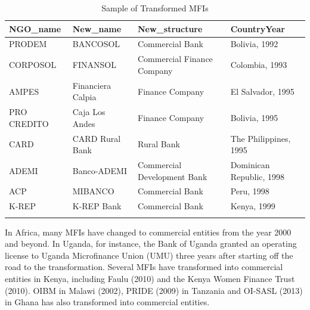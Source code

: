 \documentclass[a4paper, nobind]{templates/ociamthesis}
\begin{document}
\begin{table}

\caption{\label{tab:unnamed-chunk-3}Sample of Transformed MFIs}
\centering
\fontsize{9}{11}\selectfont
\begin{tabu} to 
\toprule
NGO\_name & New\_name & New\_structure & CountryYear\\
\midrule
PRODEM & BANCOSOL & Commercial Bank & Bolivia, 1992\\
CORPOSOL & FINANSOL & Commercial Finance Company & Colombia, 1993\\
AMPES & Financiera Calpia & Finance Company & El Salvador, 1995\\
PRO CREDITO & Caja Los Andes & Finance Company & Bolivia, 1995\\
CARD & CARD Rural Bank & Rural Bank & The Philippines, 1995\\
\addlinespace
ADEMI & Banco-ADEMI & Commercial Development Bank & Dominican Republic, 1998\\
ACP & MIBANCO & Commercial Bank & Peru, 1998\\
K-REP & K-REP Bank & Commercial Bank & Kenya, 1999\\
\bottomrule
{}\\
\end{tabu}
\end{table}

In Africa, many MFIs have changed to commercial entities from the year 2000 and beyond. In Uganda, for instance, the Bank of Uganda granted an operating license to Uganda Microfinance Union (UMU) three years after starting off the road to the transformation. Several MFIs have transformed into commercial entities in Kenya, including Faulu (2010) and the Kenya Women Finance Trust (2010). OIBM in Malawi (2002), PRIDE (2009) in Tanzania and OI-SASL (2013) in Ghana has also transformed into commercial entities.
\end{document}

